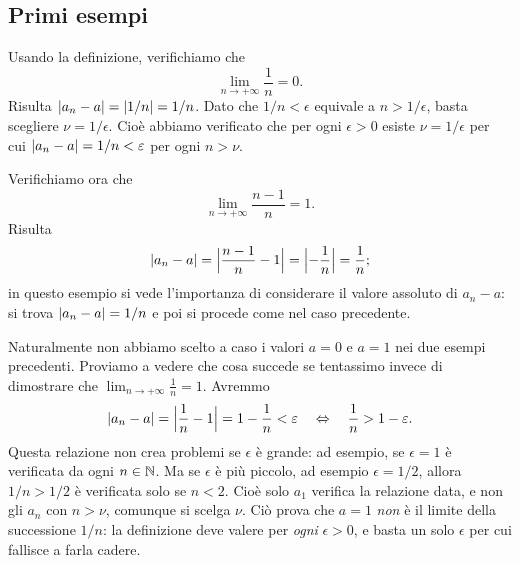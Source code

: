 \subsection{Primi esempi}

\begin{esempio}\label{es:lim-1n}
Usando la definizione, verifichiamo che
\begin{equation}\label{eq:lim-1n}
  \lim_{n\to+\infty}\frac1n=0 .
\end{equation}
Risulta $\lvert a_{n}-a\rvert=\lvert 1/n\rvert=1/n$. Dato che $1/n<\epsilon$ equivale a $n>1/\epsilon$,
basta scegliere $\nu=1/\epsilon$. Cioè abbiamo verificato che per ogni $\epsilon>0$
esiste $\nu=1/\epsilon$ per cui $\lvert a_{n}-a\rvert=1/n<\varepsilon$ per ogni $n>\nu$.
\end{esempio}

\begin{esempio}\label{es:lim-n1n}
Verifichiamo ora che
\begin{equation}\label{eq:lim-n1n}
  \lim_{n\to+\infty}\frac{n-1}{n}=1 .
\end{equation}
Risulta
\[
  \lvert a_{n}-a\rvert=\Bigl|\frac{n-1}{n}-1\Bigr|=\Bigl|-\frac1n\Bigr|=\frac1n ;
\]
in questo esempio si vede l'importanza di considerare il valore assoluto di $a_{n}-a$: si
trova $\lvert a_{n}-a\rvert=1/n$ e poi si procede come nel caso precedente.
\end{esempio}

\begin{esempio}\label{es:lim-sbagliato}
Naturalmente non abbiamo scelto a caso i valori $a=0$ e $a=1$ nei due esempi precedenti.
Proviamo a vedere che cosa succede se tentassimo invece di dimostrare che
$\lim_{n\to+\infty}\frac1n=1$. Avremmo
\[
  \lvert a_{n}-a\rvert=\Bigl|\frac1n-1\Bigr|=1-\frac1n<\varepsilon
  \quad\Leftrightarrow\quad \frac1n>1-\varepsilon .
\]
Questa relazione non crea problemi se $\epsilon$ è grande: ad esempio, se $\epsilon=1$ è
verificata da ogni $n\in\mathbb{N}$. Ma se $\epsilon$ è più piccolo, ad esempio $\epsilon=1/2$,
allora $1/n>1/2$ è verificata solo se $n<2$. Cioè solo $a_{1}$ verifica la relazione
data, e non gli $a_{n}$ con $n>\nu$, comunque si scelga $\nu$. Ciò prova che $a=1$
\emph{non} è il limite della successione $1/n$: la definizione deve valere per
\emph{ogni} $\epsilon>0$, e basta un solo $\epsilon$ per cui fallisce a farla cadere.
\end{esempio}

